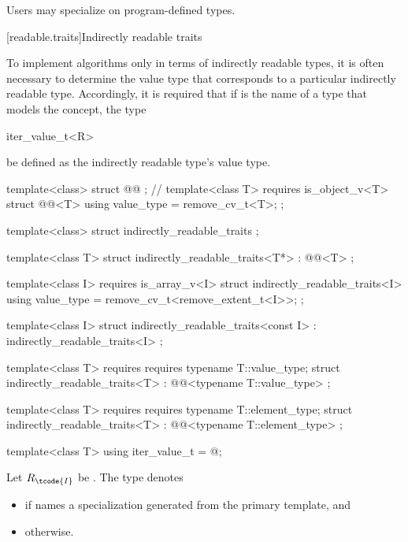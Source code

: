 \pnum
Users may specialize  on program-defined types.

[readable.traits]{Indirectly readable traits}

\pnum
To implement algorithms only in terms of indirectly readable types,
it is often necessary
to determine the value type that corresponds to
a particular indirectly readable type.
Accordingly, it is required that if  is the name of a type that
models the  concept,
the type
\begin{codeblock}
iter_value_t<R>
\end{codeblock}
be defined as the indirectly readable type's value type.

%
\begin{codeblock}
template<class> struct @@ { };     // \expos
template<class T>
  requires is_object_v<T>
struct @@<T> {
  using value_type = remove_cv_t<T>;
};

template<class> struct indirectly_readable_traits { };

template<class T>
struct indirectly_readable_traits<T*>
  : @@<T> { };

template<class I>
  requires is_array_v<I>
struct indirectly_readable_traits<I> {
  using value_type = remove_cv_t<remove_extent_t<I>>;
};

template<class I>
struct indirectly_readable_traits<const I>
  : indirectly_readable_traits<I> { };

template<class T>
  requires requires { typename T::value_type; }
struct indirectly_readable_traits<T>
  : @@<typename T::value_type> { };

template<class T>
  requires requires { typename T::element_type; }
struct indirectly_readable_traits<T>
  : @@<typename T::element_type> { };

template<class T> using iter_value_t = @\seebelow@;
\end{codeblock}

%
\pnum
Let $R_\tcode{I}$ be .
The type  denotes
\begin{itemize}
\item
{}
if  names a specialization
generated from the primary template, and

\item
{} otherwise.
\end{itemize}

